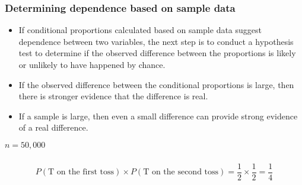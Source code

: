 \documentclass[slidestop,compress,mathserif]{beamer}
\newcommand{\soln}[1]{\textit{#1}}
\begin{document}
\begin{frame}
\frametitle{Determining dependence based on sample data}

\begin{itemize}

\item If conditional proportions calculated based on sample data suggest dependence between two variables, the next step is to conduct a hypothesis test to determine if the observed difference between the proportions is likely or unlikely to have happened by chance.

\item If the observed difference between the conditional proportions is large, then there is stronger evidence that the difference is real.

\item If a sample is large, then even a small difference can provide strong evidence of a real difference.

\end{itemize}

\pause

 \pause \soln{$n = 50,000$}

\end{frame}


\begin{frame}
\frametitle{}


\pause


\pause

\[ P(\text{T on the first toss}) \times  P(\text{T on the second toss}) = \frac{1}{2} \times \frac{1}{2} = \frac{1}{4} \]

\end{frame}


\end{document}
